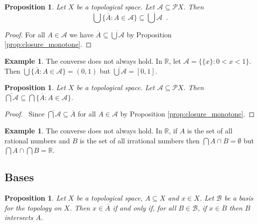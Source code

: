 \documentclass{book}
\let\qed\relax
\newtheorem{prop}[ax]{Proposition}
\theoremstyle{definition}
\newtheorem{ex}[ax]{Example}
\begin{document}
\begin{prop}
Let $X$ be a topological space. Let $\mathcal{A} \subseteq \mathcal{P} X$. Then
\[ \bigcup \{ \overline{A} : A \in \mathcal{A} \} \subseteq \overline{\bigcup \mathcal{A}} \enspace . \]
\end{prop}

\begin{proof}
\pf
For all $A \in \mathcal{A}$ we have $\overline{A} \subseteq \overline{\bigcup \mathcal{A}}$ by Proposition \ref{prop:closure_monotone}. \qed
\end{proof}

\begin{ex}
The converse does not always hold. In $\mathbb{R}$, let $\mathcal{A} = \{ \{ x \} : 0 < x < 1 \}$. Then $\bigcup \{ \overline{A} : A \in \mathcal{A} \} = (0,1)$ but $\overline{\bigcup \mathcal{A}} = [0,1]$.
\end{ex}

\begin{prop}
Let $X$ be a topological space. Let $\mathcal{A} \subseteq \mathcal{P} X$. Then $\overline{\bigcap \mathcal{A}} \subseteq \bigcap \{ \overline{A} : A \in \mathcal{A} \}$.
\end{prop}

\begin{proof}
\pf\ Since $\overline{\bigcap \mathcal{A}} \subseteq \overline{A}$ for all $A \in \mathcal{A}$ by Proposition \ref{prop:closure_monotone}. \qed
\end{proof}

\begin{ex}
The converse does not always hold. In $\mathbb{R}$, if $A$ is the set of all rational numbers and $B$ is the set of all irrational numbers then $\bigcap{A \cap B} = \emptyset$ but $\bigcap{A} \cap \bigcap{B} = \mathbb{R}$.
\end{ex}

\subsection{Bases}

\begin{prop}
\label{prop:closure_basis}
Let $X$ be a topological space, $A \subseteq X$ and $x \in X$. Let $\mathcal{B}$ be a basis for the topology on $X$. Then $x \in \overline{A}$ if and only if, for all $B \in \mathcal{B}$, if $x \in B$ then $B$ intersects $A$.
\end{prop}
\end{document}
